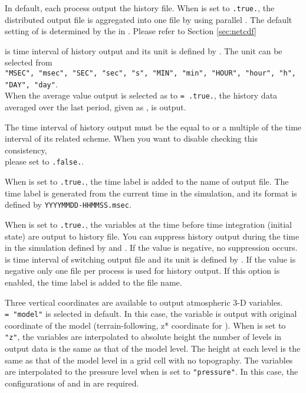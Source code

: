 In default, each process output the history file.
When  is set to \verb|.true.|, the distributed output file is aggregated into one file by using parallel \Netcdf.
The default setting of  is determined by the  in .
Please refer to Section \ref{sec:netcdf}

 is time interval of history output and its unit is defined by .
The unit can be selected from\\
\verb|"MSEC", "msec", "SEC", "sec", "s", "MIN", "min", "HOUR", "hour", "h", "DAY", "day"|.\\
%
When the average value output is selected as  to \verb|= .true.|,
the history data averaged over the last period, given as , is output.

The time interval of history output must be the equal to or a multiple of the time interval of its related scheme.
When you want to disable checking this consistency,\\
please set  to \verb|.false.|.

When  is set to \verb|.true.|, the time label is added to the name of output file.
The time label is generated from the current time in the simulation, and its format is defined by \verb|YYYYMMDD-HHMMSS.msec|.

When  is set to \verb|.true.|, the variables at the time before time integration (initial state) are output to history file.
You can suppress history output during the time in the simulation defined by  and .
If the value is negative, no suppression occurs.
 is time interval of switching output file and its unit is defined by .
If the value is negative only one file per process is used for history output. If this option is enabled, the time label is added to the file name.

Three vertical coordinates are available to output atmospheric 3-D variables.\\
 \verb|= "model"| is selected in default.
In this case, the variable is output with original coordinate of the model (terrain-following, z* coordinate for \scalerm).
When  is set to \verb|"z"|, the variables are interpolated to absolute height
the number of levels in output data is the same as that of the model level.
The height at each level is the same as that of the model level in a grid cell with no topography.
The variables are interpolated to the pressure level when  is set to \verb|"pressure"|.
In this case, the configurations of  and  in  are required.

